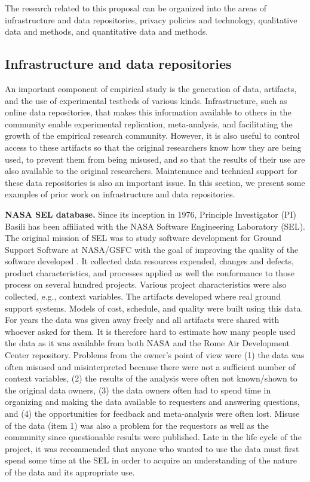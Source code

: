 The research related to this proposal can be organized into the areas of
infrastructure and data repositories, privacy policies and technology,
qualitative data and methods, and quantitative data and methods.

\subsection{Infrastructure and data repositories}

An important component of empirical study is the generation of data,
artifacts, and the use of experimental testbeds of various
kinds. Infrastructure, such as online data repositories, that makes this
information available to others in the community enable experimental
replication, meta-analysis, and facilitating the growth of the empirical
research community.  However, it is also useful to control access to these
artifacts so that the original researchers know how they are being used, to
prevent them from being misused, and so that the results of their use are
also available to the original researchers.  Maintenance and technical
support for these data repositories is also an important issue. In this
section, we present some examples of prior work on infrastructure and data
repositories.

{\bf NASA SEL database.} Since its inception in 1976, Principle
Investigator (PI) Basili has been affiliated with the NASA Software
Engineering Laboratory (SEL).  The original mission of SEL was to study
software development for Ground Support Software at NASA/GSFC with the goal
of improving the quality of the software developed \cite{Basili95}. It
collected data resources expended, changes and defects, product
characteristics, and processes applied as well the conformance to those
process on several hundred projects. Various project characteristics were
also collected, e.g., context variables. The artifacts developed where real
ground support systems.  Models of cost, schedule, and quality were built
using this data.  For years the data was given away freely and all
artifacts were shared with whoever asked for them. It is therefore hard to
estimate how many people used the data as it was available from both NASA
and the Rome Air Development Center repository. Problems from the owner's
point of view were (1) the data was often misused and misinterpreted
because there were not a sufficient number of context variables, (2) the
results of the analysis were often not known/shown to the original data
owners, (3) the data owners often had to spend time in organizing and
making the data available to requesters and answering questions, and (4)
the opportunities for feedback and meta-analysis were often lost. Misuse of
the data (item 1) was also a problem for the requestors as well as the
community since questionable results were published. Late in the life cycle
of the project, it was recommended that anyone who wanted to use the data
must first spend some time at the SEL in order to acquire an understanding
of the nature of the data and its appropriate use.

